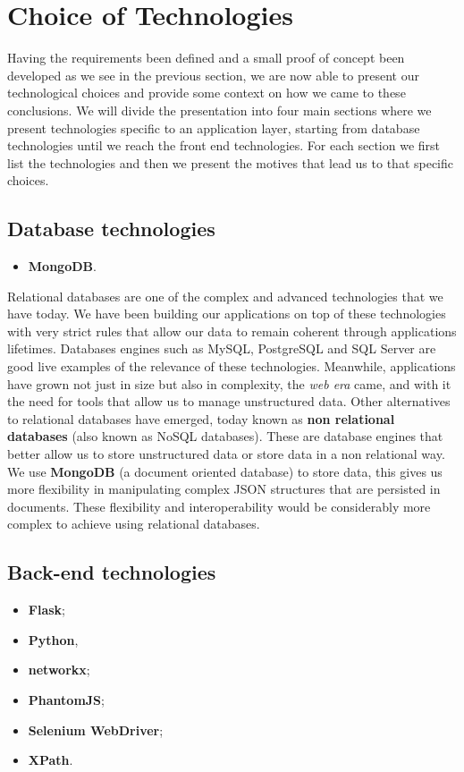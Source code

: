 \section{Choice of Technologies}
Having the requirements been defined and a small proof of concept been developed as we see in the previous section, we are now able to present our technological choices and provide some context on how we came to these conclusions. We will divide the presentation into four main sections where we present technologies specific to an application layer, starting from database technologies until we reach the front end technologies. For each section we first list the technologies and then we present the motives that lead us to that specific choices.

\subsection{Database technologies}
\begin{itemize}
    \item \textbf{MongoDB}.
\end{itemize}

Relational databases are one of the complex and advanced technologies that we have today. We have been building our applications on top of these technologies with very strict rules that allow our data to remain coherent through applications lifetimes. Databases engines such as MySQL, PostgreSQL and SQL Server are good live examples of the relevance of these technologies. Meanwhile, applications have grown not just in size but also in complexity, the \textit{web era} came, and with it the need for tools that allow us to manage unstructured data. Other alternatives to relational databases have emerged, today known as \textbf{non relational databases} (also known as NoSQL databases). These are database engines that better allow us to store unstructured data or store data in a non relational way.\\
\indent We use \textbf{MongoDB} \citep{mongodb} (a document oriented database) to store data, this gives us more flexibility in manipulating complex JSON structures that are persisted in documents. These flexibility and interoperability would be considerably more complex to achieve using relational databases.

\subsection{Back-end technologies}
\begin{itemize}
    \item \textbf{Flask};
    \item \textbf{Python},
    \item \textbf{networkx};
    \item \textbf{PhantomJS};
    \item \textbf{Selenium WebDriver};
    \item \textbf{XPath}.
\end{itemize}

